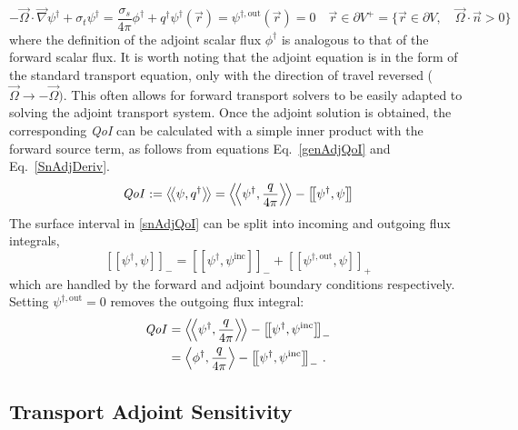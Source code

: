 \documentclass[12pt]{report}
\newcommand{\vr}{\vec{r}}
\newcommand{\vO}{\vec{\Omega}}
\newcommand{\bra}{\left\langle}
\newcommand{\ket}{\right\rangle}
\newcommand{\braSN}{\left\langle \! \left\langle}
\newcommand{\ketSN}{\right\rangle \! \right\rangle}
\newcommand{\sbraSN}{\left[ \! \left[}
\newcommand{\sketSN}{\right] \! \right]}
\newcommand{\grad}{\vec{\nabla}}
\newcommand{\bound}{\partial V}
\newcommand{\sigt}{\sigma_t}
\newcommand{\sigs}{\sigma_s}
\newcommand{\angSource}{\frac{q}{4 \pi}}
\newcommand{\scalResp}{q^\dag}
\newcommand{\qoi}{{\it QoI}\xspace}
\begin{document}
\begin{subequations}
\begin{equation}
\label{transAdj}
- \vO \cdot \grad \psi^\dag + \sigt \psi^\dag = \frac{\sigs}{4 \pi} \phi^\dag + \scalResp
\end{equation}
\begin{equation}
\psi^\dag(\vr) = \psi^{\dag, \text{out}}(\vr)=0 \quad \vr \in \partial V^{+} = \{  \vr \in \bound , \quad \vO \cdot \vec{n} > 0 \}
\end{equation}
\end{subequations}
where the definition of the adjoint scalar flux $\phi^\dag$ is analogous to that of 
the forward scalar flux. It is worth noting that the adjoint equation is in the form of the standard transport equation, only with the direction of travel reversed ($\vO \to -\vO)$. This often allows for forward transport solvers to be easily adapted to solving the adjoint transport system. Once the adjoint solution is obtained, the corresponding \qoi can be calculated with a simple inner product with the forward source term, as follows from equations Eq.~\eqref{genAdjQoI} and Eq.~\eqref{SnAdjDeriv}. 
\begin{equation}
\label{snAdjQoI}
\qoi := \braSN  \psi,q^\dag \ketSN = \braSN \psi^\dag , \angSource \ketSN - \sbraSN \psi^\dag,  \psi \sketSN
\end{equation}
%
The surface interval in \eqref{snAdjQoI} can be split into incoming and outgoing flux integrals, 
\[
\sbraSN \psi^\dag, \psi \sketSN_- 
= \sbraSN \psi^\dag,  \psi^{\text{inc}} \sketSN_- + \sbraSN \psi^{\dag,\text{out}},\psi \sketSN_+
\]
which are handled by the forward and adjoint boundary conditions respectively. Setting $\psi^{\dag, \text{out}}=0$ removes the outgoing flux integral:
%
\begin{equation}
\label{snAdjQoIBCsplit}
\begin{split}
\qoi &= \braSN \psi^\dag , \angSource \ketSN - \sbraSN \psi^\dag,  \psi^{\text{inc}} \sketSN_- \\
&= \bra \phi^\dag , \angSource \ket - \sbraSN \psi^\dag,  \psi^{\text{inc}} \sketSN_- \,.
\end{split}
\end{equation}

\subsection{Transport Adjoint Sensitivity}
\end{document}
